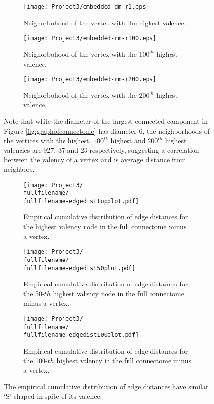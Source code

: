 \documentclass[11]{article}
\newcommand{\fullfilename}{fullminus1-2p}
\theoremstyle{remark}
\theoremstyle{definition}
\begin{document}
\begin{figure} [h]
  \centering
  \begin{subfigure}[b]{0.3\linewidth}
    \texttt{[image: Project3/embedded-dm-r1.eps]}
    \caption{Neighorbohood of the vertex with the highest valence.}
  \end{subfigure}
  \begin{subfigure}[b]{0.3\linewidth}
    \texttt{[image: Project3/embedded-rm-r100.eps]}
    \caption{Neighorbohood of the vertex with the $100^{th}$ highest valence.} 
  \end{subfigure}
  \begin{subfigure}[b]{0.3\linewidth}
    \texttt{[image: Project3/embedded-rm-r200.eps]}
    \caption{Neighorbohood of the vertex with the $200^{th}$ highest valence.}
  \end{subfigure}
  \caption{Note that while the diameter of the largest connected component in Figure \ref{fig:graphofconnectome} has diameter 6, the neighborhoods of the vertices with the highest, $100^{th}$ highest and $200^{th}$ highest valencies are 927, 37 and 23 respectively, suggesting a correlation between the valency of a vertex and is average distance from neighbors.}
  \label{fig:nthneighbors}
\end{figure}  

\begin{figure} [h]
  \centering
  \begin{subfigure}[b]{0.3\linewidth}
    \texttt{[image: Project3/\\fullfilename/\\fullfilename-edgedisttopplot.pdf]}
    \caption{Empirical cumulative distribution of edge distances for the highest valency node in the full connectome minus a vertex.}
  \end{subfigure}
  \begin{subfigure}[b]{0.3\linewidth}
    \texttt{[image: Project3/\\fullfilename/\\fullfilename-edgedist50plot.pdf]}
    \caption{Empirical cumulative distribution of edge distances for the 50-$th$ highest valency node in the full connectome minus a vertex.} 
  \end{subfigure}
  \begin{subfigure}[b]{0.3\linewidth}
    \texttt{[image: Project3/\\fullfilename/\\fullfilename-edgedist100plot.pdf]}
    \caption{Empirical cumulative distribution of edge distances for the 100-$th$ highest valency in the full connectome minus a vertex.}
  \end{subfigure}
  \caption{The empirical cumulative distribution of edge distances have similar `S' shaped in spite of its valence.} 
  \label{fig:indvcumedge}
\end{figure}  
\end{document}
